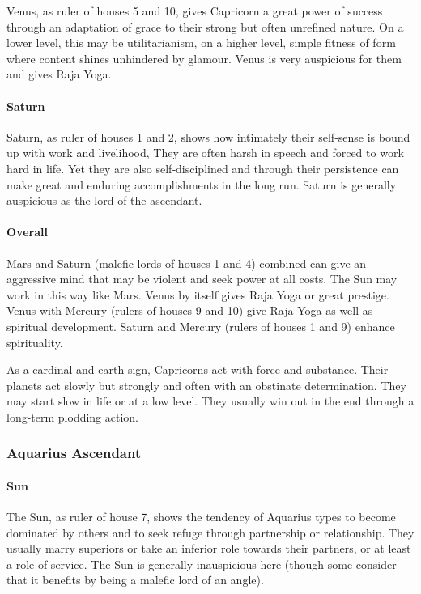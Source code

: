 Venus, as ruler of houses 5 and 10, gives Capricorn a great power of success through an adaptation of grace to their strong but often unrefined nature. On a lower level, this may be utilitarianism, on a higher level, simple fitness of form where content shines unhindered by glamour. Venus is very auspicious for them and gives Raja Yoga.

 

\paragraph{Saturn}

Saturn, as ruler of houses 1 and 2, shows how intimately their self‑sense is bound up with work and livelihood, They are often harsh in speech and forced to work hard in life. Yet they are also self‑disciplined and through their persistence can make great and enduring accomplishments in the long run. Saturn is generally auspicious as the lord of the ascendant.

 

\paragraph{Overall}

Mars and Saturn (malefic lords of houses 1 and 4) combined can give an aggressive mind that may be violent and seek power at all costs. The Sun may work in this way like Mars. Venus by itself gives Raja Yoga or great prestige. Venus with Mercury (rulers of houses 9 and 10) give Raja Yoga as well as spiritual development. Saturn and Mercury (rulers of houses 1 and 9) enhance spirituality.

 

As a cardinal and earth sign, Capricorns act with force and substance. Their planets act slowly but strongly and often with an obstinate determination. They may start slow in life or at a low level. They usually win out in the end through a long-term plodding action.

 

\subsubsection{Aquarius Ascendant}
 

\paragraph{Sun}

The Sun, as ruler of house 7, shows the tendency of Aquarius types to become dominated by others and to seek refuge through partnership or relationship. They usually marry superi­ors or take an inferior role towards their partners, or at least a role of service. The Sun is generally inauspicious here (though some consider that it benefits by being a malefic lord of an angle).

